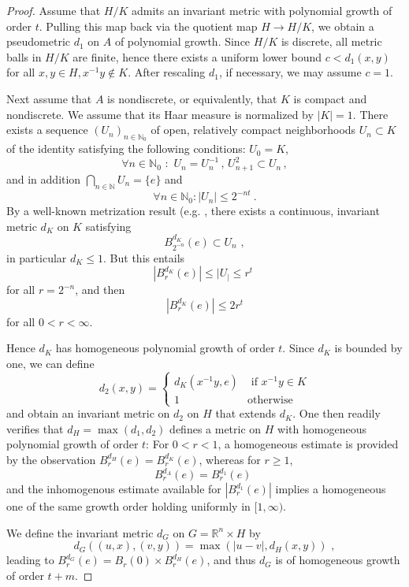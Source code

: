 \documentclass[12pt, reqno]{amsart}
\begin{document}
\begin{proof}
Assume that $H/K$ admits an invariant metric with polynomial growth of order $t$. Pulling this map back via the quotient map $H \to H/K$, we obtain a pseudometric $d_1$ on $A$ of polynomial growth. Since $H/K$ is discrete, all metric balls in $H/K$ are finite, hence there exists a uniform lower bound $c < d_1(x,y)$ for all $x,y \in H, x^{-1}y  \not\in K$. After rescaling $d_1$, if necessary, we may assume $c=1$. 

Next assume that $A$ is nondiscrete, or equivalently, that $K$ is compact and nondiscrete. We assume that its Haar measure is normalized by $|K| = 1$. There exists a sequence $(U_n)_{n \in \mathbb{N}_0}$ of open, relatively compact neighborhoods $U_n \subset K$ of the identity satisfying the following conditions: $U_{0} = K$, 
\[ \forall n \in \mathbb{N}_0 \,\,:\,\, U_n = U_n^{-1}\,,\, U_{n+1}^2 \subset U_n\,, \]
and in addition $\bigcap_{n \in \mathbb{N}} U_n = \{ e \}$ and 
\[
\forall n \in \mathbb{N}_0: |U_n| \le 2^{-nt}~.
\]
By a well-known metrization result (e.g. \cite[Theorem 8.2]{MR551496}, there exists a continuous, invariant metric $d_K$ on $K$ satisfying
\[
B^{d_K}_{2^{-n}}(e) \subset U_{n}\,\,,
\] in particular $d_K \le 1$. 
But this entails 
\[
|B^{d_K}_r(e)| \le|U_| \le r^t \,\,  
\] for all $r = 2^{-n}$, and then
\[ |B^{d_K}_r(e)| \le 2r^t \] for all $0 < r < \infty$.

Hence $d_K$ has homogeneous polynomial growth of order $t$. Since $d_K$ is bounded by one, we can define 
\[
d_2(x,y) = \left\{ \begin{array}{cc} d_K(x^{-1}y,e) & \mbox{ if } x^{-1}y \in K \\ 1 & \mbox{otherwise} \end{array} \right.
\]
and obtain an invariant metric on $d_2$ on $H$ that extends $d_K$. One then readily verifies that 
$d_H = \max(d_1,d_2)$ defines a metric on $H$ with homogeneous polynomial growth of order $t$: For $0<r < 1$, a homogeneous estimate is provided by the observation
$B_r^{d_H}(e) = B_r^{d_K}(e)$, whereas for $r\ge1$, 
\[ B_r^{d_A}(e) = B_r^{d_1}(e) \,\,\] and the inhomogenous estimate available for $|B_r^{d_1}(e)|$ implies a homogeneous one of the same growth order holding uniformly in $[1,\infty)$. 

We define the invariant metric $d_G$ on $G = \mathbb{R}^n \times H$ by
\begin{equation} \label{eqn:prod_met} d_G ((u,x),(v,y)) = \max (|u-v|, d_H(x,y) ) \,\,,\end{equation}
leading to $B_{r}^{d_G}(e) = B_r(0) \times B_r^{d_H}(e)$, and thus $d_G$ is of homogeneous growth of order $t+m$.
\end{proof}
\end{document}
